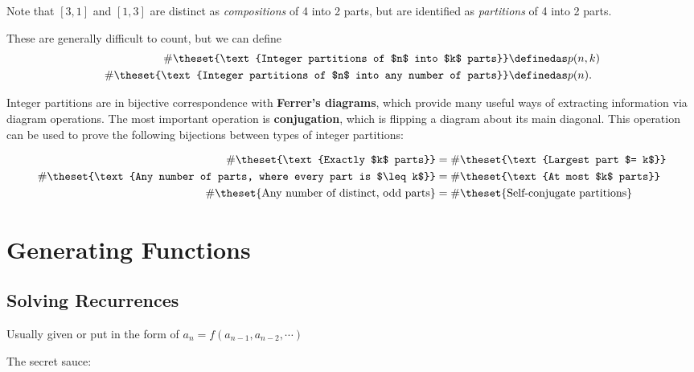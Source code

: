 Note that \([3,1]\) and \([1,3]\) are distinct as \emph{compositions} of
4 into 2 parts, but are identified as \emph{partitions} of 4 into 2
parts.

These are generally difficult to count, but we can define
\begin{align*}\begin{aligned}
\# \theset{\text{Integer partitions of $n$ into $k$ parts}} &\definedas p(n, k) \\
\# \theset{\text{Integer partitions of $n$ into any number of parts}} &\definedas p(n).
\end{aligned}\end{align*}

Integer partitions are in bijective correspondence with \textbf{Ferrer's
diagrams}, which provide many useful ways of extracting information via
diagram operations. The most important operation is
\textbf{conjugation}, which is flipping a diagram about its main
diagonal. This operation can be used to prove the following bijections
between types of integer partitions:

\begin{align*}\begin{aligned}
\#\theset{\text{Exactly $k$ parts}} &= \#\theset{\text{Largest part $= k$}}\\
\#\theset{\text{Any number of parts, where every part is $\leq k$}} &= \#\theset{\text{At most $k$ parts}} \\
\#\theset{\text{Any number of distinct, odd parts}} &= \#\theset{\text{Self-conjugate partitions}}
\end{aligned}\end{align*}

\hypertarget{generating-functions}{%
\section{Generating Functions}\label{generating-functions}}

\hypertarget{solving-recurrences}{%
\subsection{Solving Recurrences}\label{solving-recurrences}}

Usually given or put in the form of
\(a_n = f(a_{n-1}, a_{n-2}, \cdots)\)

The secret sauce:

